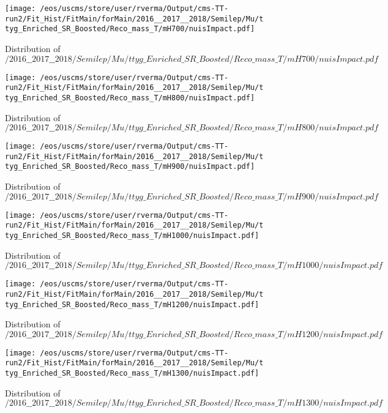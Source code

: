 \begin{figure}
\centering
\texttt{[image: /eos/uscms/store/user/rverma/Output/cms-TT-run2/Fit\_Hist/FitMain/forMain/2016\_\_2017\_\_2018/Semilep/Mu/ttyg\_Enriched\_SR\_Boosted/Reco\_mass\_T/mH700/nuisImpact.pdf]}
\caption{Distribution of $/2016\_\_2017\_\_2018/Semilep/Mu/ttyg\_Enriched\_SR\_Boosted/Reco\_mass\_T/mH700/nuisImpact.pdf$}
\end{figure}

\begin{figure}
\centering
\texttt{[image: /eos/uscms/store/user/rverma/Output/cms-TT-run2/Fit\_Hist/FitMain/forMain/2016\_\_2017\_\_2018/Semilep/Mu/ttyg\_Enriched\_SR\_Boosted/Reco\_mass\_T/mH800/nuisImpact.pdf]}
\caption{Distribution of $/2016\_\_2017\_\_2018/Semilep/Mu/ttyg\_Enriched\_SR\_Boosted/Reco\_mass\_T/mH800/nuisImpact.pdf$}
\end{figure}

\begin{figure}
\centering
\texttt{[image: /eos/uscms/store/user/rverma/Output/cms-TT-run2/Fit\_Hist/FitMain/forMain/2016\_\_2017\_\_2018/Semilep/Mu/ttyg\_Enriched\_SR\_Boosted/Reco\_mass\_T/mH900/nuisImpact.pdf]}
\caption{Distribution of $/2016\_\_2017\_\_2018/Semilep/Mu/ttyg\_Enriched\_SR\_Boosted/Reco\_mass\_T/mH900/nuisImpact.pdf$}
\end{figure}

\begin{figure}
\centering
\texttt{[image: /eos/uscms/store/user/rverma/Output/cms-TT-run2/Fit\_Hist/FitMain/forMain/2016\_\_2017\_\_2018/Semilep/Mu/ttyg\_Enriched\_SR\_Boosted/Reco\_mass\_T/mH1000/nuisImpact.pdf]}
\caption{Distribution of $/2016\_\_2017\_\_2018/Semilep/Mu/ttyg\_Enriched\_SR\_Boosted/Reco\_mass\_T/mH1000/nuisImpact.pdf$}
\end{figure}

\begin{figure}
\centering
\texttt{[image: /eos/uscms/store/user/rverma/Output/cms-TT-run2/Fit\_Hist/FitMain/forMain/2016\_\_2017\_\_2018/Semilep/Mu/ttyg\_Enriched\_SR\_Boosted/Reco\_mass\_T/mH1200/nuisImpact.pdf]}
\caption{Distribution of $/2016\_\_2017\_\_2018/Semilep/Mu/ttyg\_Enriched\_SR\_Boosted/Reco\_mass\_T/mH1200/nuisImpact.pdf$}
\end{figure}

\begin{figure}
\centering
\texttt{[image: /eos/uscms/store/user/rverma/Output/cms-TT-run2/Fit\_Hist/FitMain/forMain/2016\_\_2017\_\_2018/Semilep/Mu/ttyg\_Enriched\_SR\_Boosted/Reco\_mass\_T/mH1300/nuisImpact.pdf]}
\caption{Distribution of $/2016\_\_2017\_\_2018/Semilep/Mu/ttyg\_Enriched\_SR\_Boosted/Reco\_mass\_T/mH1300/nuisImpact.pdf$}
\end{figure}

